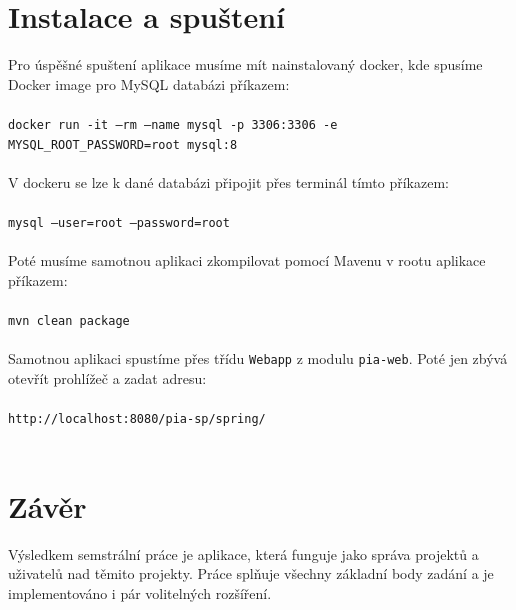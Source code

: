 \documentclass[czech,P5]{thesiskiv}
\begin{document}
\chapter{Instalace a spuštení}
Pro úspěšné spuštení aplikace musíme mít nainstalovaný docker, kde spusíme Docker image pro MySQL databázi příkazem:
\\\\
\texttt{docker run -it --rm --name mysql -p 3306:3306 -e MYSQL\_ROOT\_PASSWORD=root mysql:8}
\\\\
V dockeru se lze k dané databázi připojit přes terminál tímto příkazem:
\\\\
\texttt{mysql --user=root --password=root}
\\\\
Poté musíme samotnou aplikaci zkompilovat pomocí Mavenu v rootu aplikace příkazem:
\\\\
\texttt{mvn clean package}
\\\\
Samotnou aplikaci spustíme přes třídu \texttt{Webapp} z modulu \texttt{pia-web}. Poté jen zbývá otevřít prohlížeč a zadat adresu:
\\\\
\texttt{http://localhost:8080/pia-sp/spring/}
\\\\

\chapter{Závěr}
Výsledkem semstrální práce je aplikace, která funguje jako správa projektů a uživatelů nad těmito projekty. Práce splňuje všechny základní body zadání a je implementováno i pár volitelných rozšíření.
\end{document}
